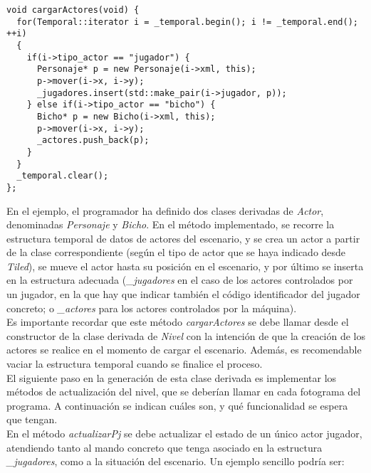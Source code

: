 \begin{lstlisting}[style=C++]
void cargarActores(void) {
  for(Temporal::iterator i = _temporal.begin(); i != _temporal.end(); ++i)
  {
    if(i->tipo_actor == "jugador") {
      Personaje* p = new Personaje(i->xml, this);
      p->mover(i->x, i->y);
      _jugadores.insert(std::make_pair(i->jugador, p));
    } else if(i->tipo_actor == "bicho") {
      Bicho* p = new Bicho(i->xml, this);
      p->mover(i->x, i->y);
      _actores.push_back(p);
    }
  }
  _temporal.clear();
};
\end{lstlisting}

En el ejemplo, el programador ha definido dos clases derivadas de \emph{Actor}, denominadas \emph{Personaje} y \emph{Bicho}. En el método implementado, se recorre la estructura temporal de datos de actores del escenario, y se crea un actor a partir de la clase correspondiente (según el tipo de actor que se haya indicado desde \emph{Tiled}), se mueve el actor hasta su posición en el escenario, y por último se inserta en la estructura adecuada (\emph{\_jugadores} en el caso de los actores controlados por un jugador, en la que hay que indicar también el código identificador del jugador concreto; o \emph{\_actores} para los actores controlados por la máquina).\\

Es importante recordar que este método \emph{cargarActores} se debe llamar desde el constructor de la clase derivada de \emph{Nivel} con la intención de que la creación de los actores se realice en el momento de cargar el escenario. Además, es recomendable vaciar la estructura temporal cuando se finalice el proceso.\\

El siguiente paso en la generación de esta clase derivada es implementar los métodos de actualización del nivel, que se deberían llamar en cada fotograma del programa. A continuación se indican cuáles son, y qué funcionalidad se espera que tengan.\\

En el método \emph{actualizarPj} se debe actualizar el estado de un único actor jugador, atendiendo tanto al mando concreto que tenga asociado en la estructura \emph{\_jugadores}, como a la situación del escenario. Un ejemplo sencillo podría ser:

